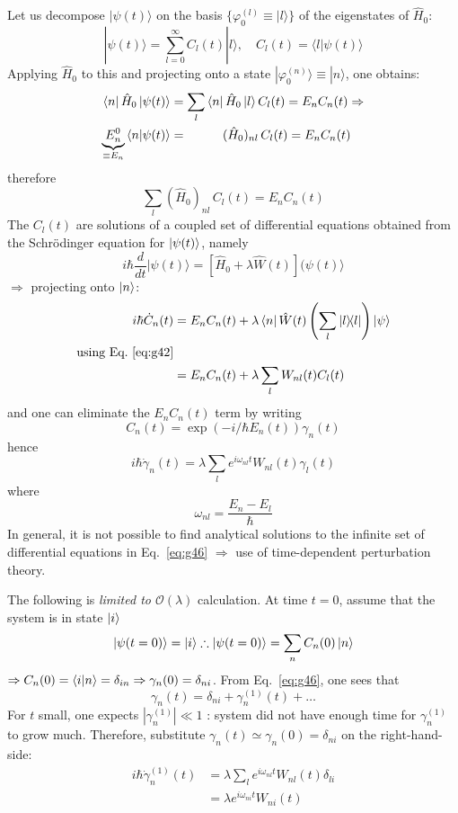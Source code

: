 \documentclass[12pt]{article}
\newcommand{\be}{\begin{equation}}
\newcommand{\ee}{\end{equation}}
\begin{document}
Let us decompose $|\psi(t)\rangle$ on the basis $\{\varphi_{0}^{(l)} \equiv|l\rangle\}$
of the eigenstates of $\hat{H}_{0}$:
\be
|\psi(t)\rangle=\sum_{l=0}^{\infty} C_{l} (t)|l\rangle, \quad C_{l}(t)=\langle l | \psi(t)\rangle
\ee
Applying $\hat{H}_{0}$ to this and projecting onto a state
$|\varphi_{0}^{(n)}\rangle \equiv |n\rangle$, one obtains:
\[
\begin{aligned}
\bra{n}\hat{H}_0\ket{\psi(t)} 
&= \sum_l \bra{n}\hat{H}_0\ket{l} C_l(t) = E_n C_n(t) \Rightarrow\\
\underbrace{E_n^{0}}_{\equiv E_n} \bra{n}\ket{\psi(t)}  
&= \quad\quad\quad\! (\hat{H}_0)_{nl} \, C_l(t) =  E_n C_n(t)
\end{aligned}
\]
therefore
\be
\sum_l (\hat{H}_0)_{nl} \, C_l(t)  =  E_n C_n(t)
\label{eq:g42}
\ee
The $C_l(t)$ are solutions of a coupled set of differential
equations obtained from the Schrödinger equation
for $\ket{\psi(t)}$, namely
\be
i\hbar \frac{d}{d t}|\psi(t)\rangle=\left[\hat{H}_{0}+\lambda \hat{W}(t)\right](\psi(t)\rangle
\ee
$\Rightarrow$ projecting onto $\ket{n}$:
\be
\begin{aligned}
i\hbar \dot{C}_n(t) 
&= E_n C_n(t) + \lambda \bra{n} \hat{W}(t)
\left(\sum_l \op{l}\right)\ket{\psi}\\
\text{using Eq.~\eqref{eq:g42}}\\
&= E_n C_n(t) + \lambda \sum_l W_{nl}(t) C_l(t)
\end{aligned}
\ee
and one can eliminate the $E_n C_n(t)$ term by writing
\be
C_n(t) = \exp(-i/\hbar E_n(t)) \gamma_n(t)
\ee
hence
\be
i \hbar \dot{\gamma}_{n}(t)=\lambda \sum_{l} e^{i \omega_{n l} t} W_{n l}(t) \gamma_{l}(t)
\label{eq:g46}
\ee
where
\be
\omega_{n l}=\frac{E_{n}-E_{l}}{\hbar}
\label{eq:g47}
\ee
In general, it is not possible to find analytical
solutions to the infinite set of differential equations
in Eq.~\eqref{eq:g46} $\Rightarrow$ use of time-dependent perturbation
theory.

The following is \emph{limited to $\mathcal{O}(\lambda)$} calculation.
At time $t=0$, assume that the system is in state $\ket{i}$
\be
\ket{\psi(t=0)} = \ket{i} \therefore \ket{\psi(t=0)} = \sum_n C_n(0) \ket{n}
\ee
$\Rightarrow C_n(0) = \bra{i}\ket{n} = \delta_{in} \Rightarrow \gamma_n(0) = \delta_{ni}$.
From Eq.~\eqref{eq:g46}, one sees that
\be
\gamma_n (t) = \delta_{ni} + \gamma_n^{(1)}(t) + \ldots
\ee
For $t$ small, one expects $|\gamma_{n}^{(1)}| \ll 1$ : system did not
have enough time for $\gamma_{n}^{(1)}$ to grow much. Therefore,
substitute $\gamma_n(t) \simeq \gamma_n(0) = \delta_{ni}$ on the right-hand-side:
\be
\begin{aligned}
i \hbar \dot{\gamma}_{n}^{(1)}(t)
&=\lambda \sum_{l} e^{i \omega_{n l} t} W_{nl}(t) \delta_{l i}\\
&=\lambda e^{i \omega_{n i} t} W_{ni}(t)
\end{aligned}
\label{eq:g50}
\ee
\end{document}
